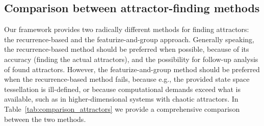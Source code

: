 \documentclass[%
 aip,
 amsmath,amssymb,
 reprint,%
]{revtex4-1}
\begin{document}
\subsection{Comparison between attractor-finding methods} 
\label{sec:compmeth}
Our framework provides two radically different methods for finding attractors: the recurrence-based and the featurize-and-group approach. Generally speaking, the recurrence-based method should be preferred when possible, because of its accuracy (finding the actual attractors), and the possibility for follow-up analysis of found attractors. However, the featurize-and-group method should be preferred when the recurrence-based method fails, because e.g., the provided state space tessellation is ill-defined, or because computational demands exceed what is available, such as in higher-dimensional systems with chaotic attractors. In Table~\ref{tab:comparison_attractors} we provide a comprehensive comparison between the two methods.
\end{document}
